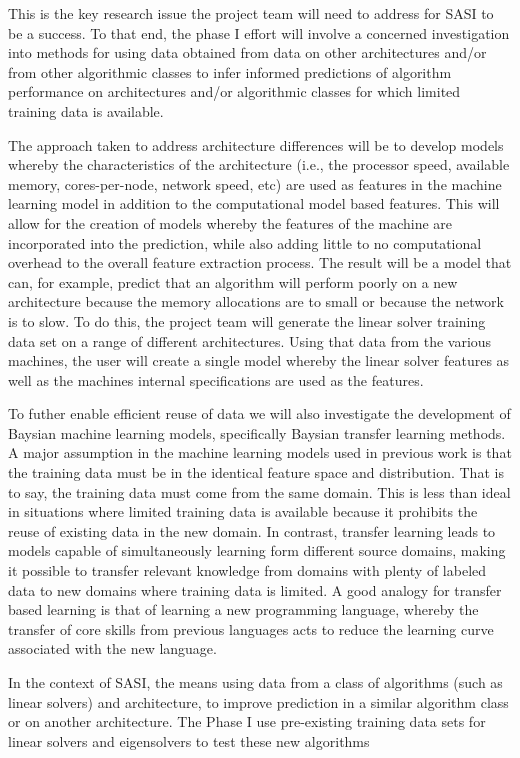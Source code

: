 This is the key research issue the project team will need to address for SASI to be a success. To that end, the phase I effort will involve a concerned investigation into methods for using data obtained from data on other architectures and/or from other algorithmic classes to infer informed predictions of algorithm performance on architectures and/or algorithmic classes for which limited training data is available. 

The approach taken to address architecture differences will be to develop models whereby the characteristics of the architecture (i.e., the processor speed, available memory, cores-per-node, network speed, etc) are used as features in the machine learning model in addition to the computational model based features. This will allow for the creation of models whereby the features of the machine are incorporated into the prediction, while also adding little to no computational overhead to the overall feature extraction process. The result will be a model that can, for example, predict that an algorithm will perform poorly on a new architecture because the memory allocations are to small or because the network is to slow. To do this, the project team will generate the linear solver training data set on a range of different architectures. Using that data from the various machines, the user will create a single model whereby the linear solver features as well as the machines internal specifications are used as the features. 

To futher enable efficient reuse of data we will also investigate the development of Baysian machine learning models, specifically Baysian transfer learning methods. A major assumption in the machine learning models used in previous work is that the training data must be in the identical feature space and distribution. That is to say, the training data must come from the same domain. This is less than ideal in situations where limited training data is available because it prohibits the reuse of existing data in the new domain. In contrast, transfer learning leads to models capable of simultaneously learning form different source domains, making it possible to transfer relevant knowledge from domains with plenty of labeled data to 
new domains where training data is limited. A good analogy for transfer based learning is that of learning a new programming language, whereby the transfer of core skills from previous languages acts to reduce the learning curve associated with the new language.

In the context of SASI, the means using data from a class of algorithms (such as linear solvers) and architecture,  to improve prediction in a similar algorithm class or on another architecture. The Phase I use pre-existing training data sets for linear solvers and eigensolvers to test these new algorithms
   
